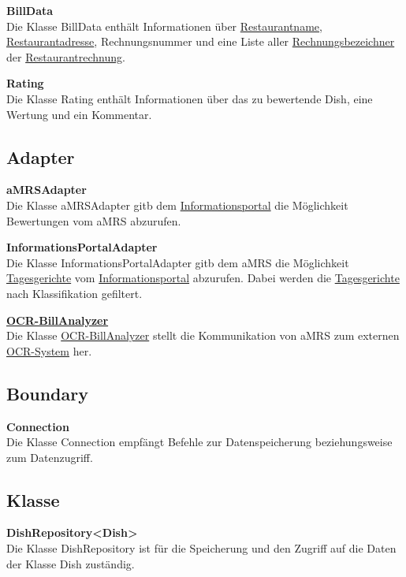\noindent \textbf{BillData} \\
Die Klasse BillData enthält Informationen über \hyperref[gls:restaurantname]{Restaurantname}, \hyperref[gls:restaurantAdresse]{Restaurantadresse}, Rechnungsnummer und eine Liste aller
\hyperref[gls:Rechnungsbezeichner]{Rechnungsbezeichner} der \hyperref[gls:restaurantRechnung]{Restaurantrechnung}.
\newline

\noindent \textbf{Rating} \\
Die Klasse Rating enthält Informationen über das zu bewertende Dish, eine Wertung und ein Kommentar.

\subsection*{Adapter}
\noindent \textbf{aMRSAdapter}\\
Die Klasse aMRSAdapter gitb dem \hyperref[gls:informationsportal]{Informationsportal} die Möglichkeit Bewertungen vom \ac{aMRS} abzurufen.
\newline

\noindent \textbf{InformationsPortalAdapter}\\
Die Klasse InformationsPortalAdapter gitb dem \ac{aMRS} die Möglichkeit \hyperref[gls:tagesgericht]{Tagesgerichte} vom \hyperref[gls:informationsportal]{Informationsportal} abzurufen.
Dabei werden die \hyperref[gls:tagesgericht]{Tagesgerichte} nach Klassifikation gefiltert.
\newline

\noindent \hyperref[gls:ocr-System]{\textbf{OCR-BillAnalyzer}}\\
Die Klasse \hyperref[gls:ocr-System]{OCR-BillAnalyzer} stellt die Kommunikation von \ac{aMRS} zum externen \hyperref[gls:ocr-System]{OCR-System} her.


\subsection*{Boundary}
\noindent \textbf{Connection}\\
Die Klasse Connection empfängt Befehle zur Datenspeicherung beziehungsweise zum Datenzugriff.

\subsection*{Klasse}
\noindent \textbf{DishRepository<Dish>}\\
Die Klasse DishRepository ist für die Speicherung und den Zugriff auf die Daten der Klasse Dish zuständig.
\newline

